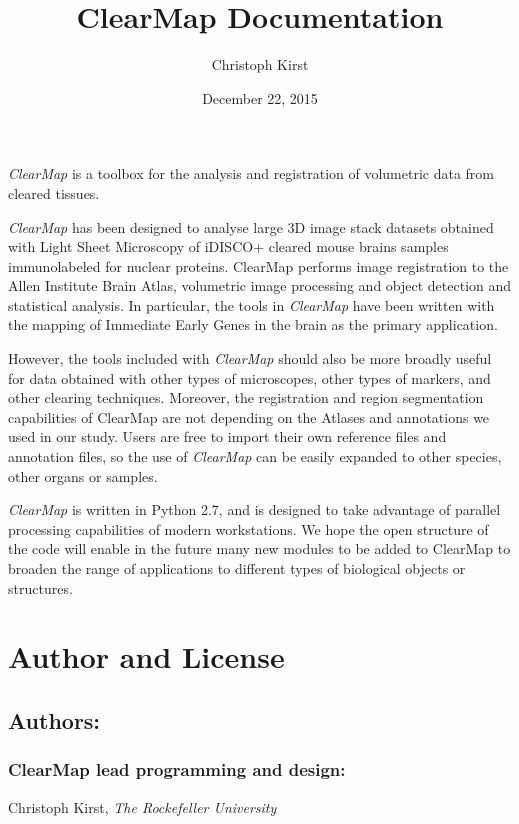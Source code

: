 \documentclass[letterpaper,10pt,english]{sphinxmanual}
\title{ClearMap Documentation}
\date{December 22, 2015}
\author{Christoph Kirst}
\begin{document}
\maketitle
\tableofcontents
{}\label{index::doc}


\emph{ClearMap} is a toolbox for the analysis and registration of volumetric data
from cleared tissues.

\emph{ClearMap} has been designed to analyse large 3D image stack datasets obtained with Light Sheet Microscopy
of iDISCO+ cleared mouse brains samples immunolabeled for nuclear proteins. ClearMap performs image registration to the Allen Institute Brain Atlas, volumetric image processing and object detection and statistical analysis. In particular, the tools in \emph{ClearMap} have been written with the mapping of Immediate Early Genes in the brain as the primary application.

However, the tools included with \emph{ClearMap} should also be more broadly useful for data obtained with other types of microscopes, other types of markers, and other clearing techniques. Moreover, the registration and region segmentation capabilities of ClearMap are not depending on the Atlases and annotations we used in our study. Users are free to import their own reference files and annotation files, so the use of \emph{ClearMap} can be easily expanded to other species, other organs or samples.

\emph{ClearMap} is written in Python 2.7, and is designed to take advantage of parallel processing capabilities of modern workstations. We hope the open structure of the code will enable in the future many new modules to be added to ClearMap to broaden the range of applications to different types of biological objects or structures.


\chapter{Author and License}
\label{index:clearmap}\label{index:author-and-license}

\section{Authors:}
\label{index:authors}

\subsection{ClearMap lead programming and design:}
\label{index:clearmap-lead-programming-and-design}
Christoph Kirst,
\emph{The Rockefeller University}
\end{document}
